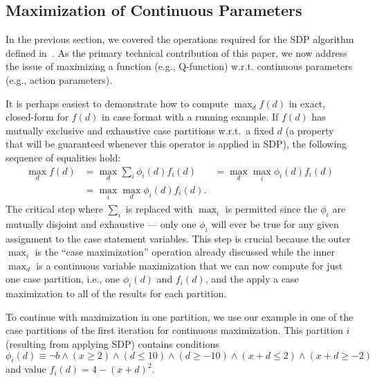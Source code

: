\subsection{Maximization of Continuous Parameters}

In the previous section, we covered the operations required for the
SDP algorithm defined in~\cite{sanner_uai11}.  As the primary
technical contribution of this paper, we now address the
issue of maximizing a function (e.g., Q-function) w.r.t. continuous
parameters (e.g., action parameters).

It is perhaps easiest to demonstrate how to compute $\max_d f(d)$ in exact,
closed-form for $f(d)$ in case format with a running example.
If $f(d)$ has mutually exclusive and exhaustive 
case partitions w.r.t.\ a fixed $d$ (a property that will be guaranteed 
whenever this operator is applied in SDP), the following sequence of
equalities hold:
\begin{align*}
\max_d f(d) & = \max_d \sum_i \phi_i(d) f_i(d) & = \max_d \max_i \phi_i(d) f_i(d)\\
            & = \max_i \max_d \phi_i(d) f_i(d).
\end{align*}
The critical step where $\sum_i$ is replaced with $\max_i$ is permitted
since the $\phi_i$ are mutually disjoint and exhaustive --- only one $\phi_i$
will ever be true for any given assignment to the case statement variables.
This step is crucial because the outer $\max_i$ is the ``case maximization''
operation already discussed while the inner $\max_d$ is a continuous variable
maximization that we can now compute for just one case partition, i.e.,
one $\phi_i(d)$ and $f_i(d)$, and the apply a case maximization to all
of the results for each partition.

To continue with maximization in one partition, we use our
\MarsRoverNL example in one of the case partitions of the first iteration for
continuous maximization.  This partition $i$ (resulting from applying SDP)
contains conditions $\phi_i(d) \equiv \neg b\wedge
(x\geq 2)\wedge (d\leq 10) \wedge (d\geq -10)\wedge (x+d\leq 2) \wedge
(x+d\geq -2) $ and value $f_i(d) = 4 - (x+d)^2 $.

